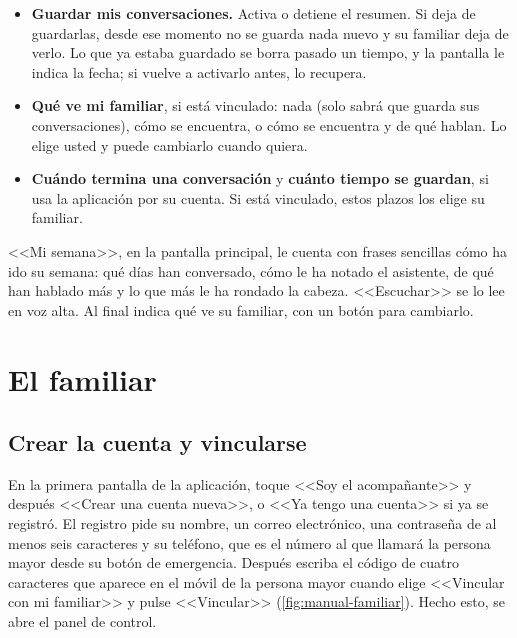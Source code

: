 \begin{itemize}
  \item \textbf{Guardar mis conversaciones.} Activa o detiene el resumen. Si deja de guardarlas, desde ese momento no se guarda nada nuevo y su familiar deja de verlo. Lo que ya estaba guardado se borra pasado un tiempo, y la pantalla le indica la fecha; si vuelve a activarlo antes, lo recupera.
  \item \textbf{Qué ve mi familiar}, si está vinculado: nada (solo sabrá que guarda sus conversaciones), cómo se encuentra, o cómo se encuentra y de qué hablan. Lo elige usted y puede cambiarlo cuando quiera.
  \item \textbf{Cuándo termina una conversación} y \textbf{cuánto tiempo se guardan}, si usa la aplicación por su cuenta. Si está vinculado, estos plazos los elige su familiar.
\end{itemize}

<<Mi semana>>, en la pantalla principal, le cuenta con frases sencillas cómo ha ido su semana: qué días han conversado, cómo le ha notado el asistente, de qué han hablado más y lo que más le ha rondado la cabeza. <<Escuchar>> se lo lee en voz alta. Al final indica qué ve su familiar, con un botón para cambiarlo.

\section{El familiar}
\label{sec:manual-familiar}

\subsection{Crear la cuenta y vincularse}

En la primera pantalla de la aplicación, toque <<Soy el acompañante>> y después <<Crear una cuenta nueva>>, o <<Ya tengo una cuenta>> si ya se registró. El registro pide su nombre, un correo electrónico, una contraseña de al menos seis caracteres y su teléfono, que es el número al que llamará la persona mayor desde su botón de emergencia. Después escriba el código de cuatro caracteres que aparece en el móvil de la persona mayor cuando elige <<Vincular con mi familiar>> y pulse <<Vincular>> (\autoref{fig:manual-familiar}). Hecho esto, se abre el panel de control.

